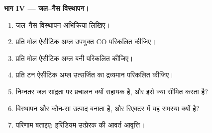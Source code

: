 \begin{problem}
\medskip\noindent\textbf{भाग IV --- जल--गैस विस्थापन।}
\begin{enumerate}[resume]
  \item जल--गैस विस्थापन अभिक्रिया लिखिए।
  \item प्रति मोल ऐसीटिक अम्ल उपभुक्त CO परिकलित कीजिए।
  \item प्रति मोल ऐसीटिक अम्ल बनी  परिकलित कीजिए।
  \item प्रति टन ऐसीटिक अम्ल उत्सर्जित  का द्रव्यमान परिकलित कीजिए।
  \item निम्नतर जल सांद्रता पर प्रचालन क्यों सहायक है, और इसे क्या सीमित करता है?
  \item विस्थापन और कौन-सा उत्पाद बनाता है, और रिएक्टर में यह समस्या
        क्यों है?
  \item परिणाम बताइए: इरिडियम उत्प्रेरक की आवर्त आवृत्ति।
\end{enumerate}
\end{problem}
